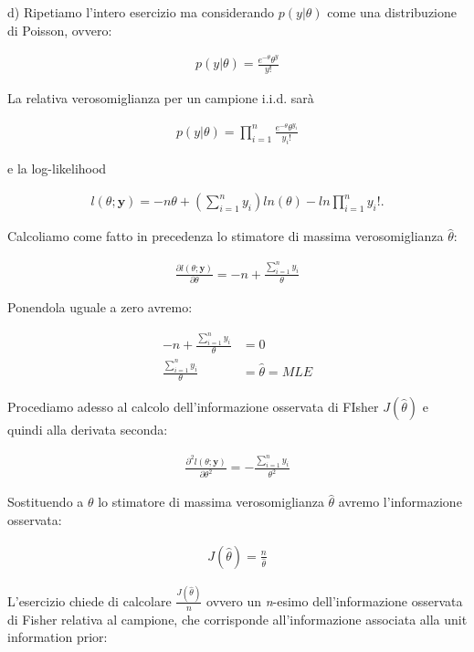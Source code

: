 \bigskip
d) Ripetiamo l'intero esercizio ma considerando $p(y|\theta)$ come una distribu\-zione 
di Poisson, ovvero:

\begin{align*}
p(y|\theta) = \frac{e^{-\theta}\theta^y}{y!}
\end{align*}

La relativa verosomiglianza per un campione i.i.d. sarà

\begin{align*}
p(y|\theta) = \prod_{i=1}^n \frac{e^{-\theta}\theta^{y_i}}{y_i!}
\end{align*}

e la log-likelihood

\begin{align*}
l(\theta;\textbf{y}) = -n\theta + \left(\sum_{i=1}^n y_i \right)ln(\theta)-ln\prod_{i=1}^n y_i!.
\end{align*}

Calcoliamo come fatto in precedenza lo stimatore di massima verosomiglianza $\hat{\theta}$:

\begin{align*}
\frac{\partial l(\theta; \textbf{y})}{\partial\theta} = -n + \frac{\sum_{i=1}^n y_i}{\theta}
\end{align*}

Ponendola uguale a zero avremo:

\begin{align*}
 -n + \frac{\sum_{i=1}^n y_i}{\theta} &= 0\\
 \frac{\sum_{i=1}^n y_i}{\theta} &= \hat{\theta} = MLE
\end{align*}

Procediamo adesso al calcolo dell'informazione osservata di FIsher $J(\hat{\theta})$ e quindi alla derivata seconda:

\begin{align*}
\frac{\partial^2 l(\theta; \textbf{y})}{\partial\theta^2} = - \frac{\sum_{i=1}^n y_i}{\theta^2}
\end{align*}

Sostituendo a $\theta$ lo stimatore di massima verosomiglianza $\hat{\theta}$ avremo l'informazione osservata:


\begin{align*}
J(\hat{\theta}) = \frac{n}{\hat{\theta}}
\end{align*}

L'esercizio chiede di calcolare $\frac{J(\hat{\theta})}{n}$ ovvero un \textit{n}-esimo dell'informazione osservata di Fisher relativa al campione, che corrisponde all'informazione associata alla unit information prior:

